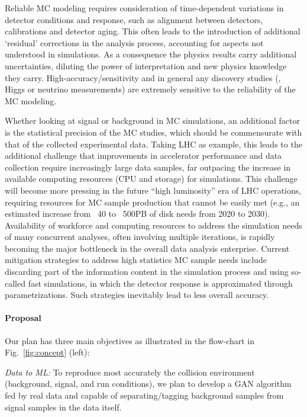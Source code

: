 Reliable MC modeling requires consideration of time-dependent variations in detector conditions and response, such as alignment between detectors, calibrations and detector aging. This often leads to the introduction of additional `residual' corrections in the analysis process, accounting for aspects not understood in simulations. As a consequence the physics results carry additional uncertainties, diluting the power of interpretation and new physics knowledge they carry. High-accuracy/sensitivity and in general any discovery studies (\eg, Higgs or neutrino measurements) are extremely sensitive to the reliability of the MC modeling.

Whether looking at signal or background in MC simulations, an additional factor is the statistical precision of the MC studies, which should be commensurate with that of the collected experimental data. Taking LHC as example, this leads to the additional challenge that improvements in accelerator performance and data collection require increasingly large data samples, far outpacing the increase in available computing resources (CPU and storage) for simulations. This challenge will become more pressing in the future ``high luminosity'' era of LHC operations, requiring resources for MC sample production that cannot be easily met (e.g., an estimated increase from ~40 to ~500PB of disk needs from 2020 to 2030). Availability of workforce and computing resources to address the simulation needs of many concurrent analyses, often involving multiple iterations, is rapidly becoming the major bottleneck in the overall data analysis enterprise. Current mitigation strategies to address high statistics MC sample needs include discarding part of the information content in the simulation process and using so-called fast simulations, in which the detector response is approximated through parametrizations. Such  strategies inevitably lead to less overall accuracy. 
\vspace{-0.5cm}
\paragraph{Proposal} Our plan has three main objectives as illustrated in the flow-chart in Fig.~\ref{fig:concept} (left):

\textit{Data to ML:} To reproduce most accurately the collision environment (background, signal, and run conditions), we plan to develop a GAN algorithm fed by real data and capable of separating/tagging background samples from signal samples in the data itself.

